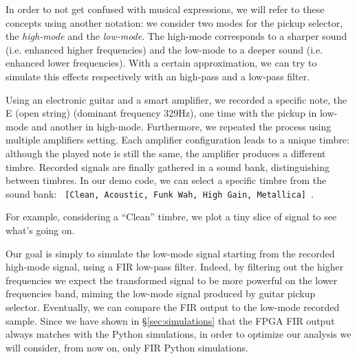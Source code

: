 In order to not get confused with musical expressions, we will refer to these concepts using another notation: we consider two modes for the pickup selector, the \emph{high-mode} and the \emph{low-mode}. The high-mode corresponds to a sharper sound (i.e. enhanced higher frequencies) and the low-mode to a deeper sound (i.e. enhanced lower frequencies). With a certain approximation, we can try to simulate this effects respectively with an high-pass and a low-pass filter.

Using an electronic guitar and a smart amplifier, we recorded a specific note, the E (open string) (dominant frequency 329Hz), one time with the pickup in low-mode and another in high-mode. Furthermore, we repeated the process using multiple amplifiers setting. Each amplifier configuration leads to a unique timbre: although the played note is still the same, the amplifier produces a different timbre. Recorded signals are finally gathered in a sound bank, distinguishing between timbres. In our demo code, we can select a specific timbre from the sound bank:
\texttt{ [Clean, Acoustic, Funk Wah, High Gain, Metallica] }.


For example, considering a “Clean” timbre, we plot a tiny slice of signal to see what’s going on.
\begin{figure}[H]
    \caption{}
    \centering
    
    \qquad
\end{figure}

Our goal is simply to simulate the low-mode signal starting from the recorded high-mode signal, using a FIR low-pass filter. Indeed, by filtering out the higher frequencies we expect the transformed signal to be more powerful on the lower frequencies band, miming the low-mode signal produced by guitar pickup selector. Eventually, we can compare the FIR output to the low-mode recorded sample. Since we have shown in §\ref{sec:simulations} that the FPGA FIR output always matches with the Python simulations, in order to optimize our analysis we will consider, from now on, only FIR Python simulations.

